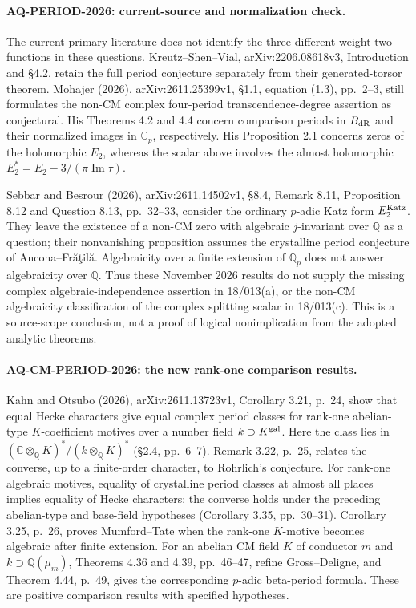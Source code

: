 \documentclass[11pt,a4paper]{article}
\theoremstyle{definition}\newtheorem{definition}[theorem]{Definition}
\theoremstyle{remark}\newtheorem{remark}[theorem]{Remark}
\begin{document}
\paragraph{AQ-PERIOD-2026: current-source and normalization check.}
The current primary literature does not identify the
three different weight-two functions in these questions.
Kreutz--Shen--Vial, arXiv:2206.08618v3, Introduction
and \S4.2, retain the full period conjecture separately
from their generated-torsor theorem. Mohajer (2026),
arXiv:2611.25399v1, \S1.1, equation (1.3), pp.~2--3,
still formulates the non-CM complex four-period
transcendence-degree assertion as conjectural.
His Theorems 4.2 and 4.4 concern comparison periods
in $B_{\rm dR}$ and their normalized images in
$\mathbb C_p$, respectively. His Proposition 2.1
concerns zeros of the holomorphic $E_2$, whereas
the scalar above involves the almost holomorphic
$E_2^*=E_2-3/(\pi\operatorname{Im}\tau)$.

Sebbar and Besrour (2026), arXiv:2611.14502v1,
\S8.4, Remark 8.11, Proposition 8.12 and
Question 8.13, pp.~32--33, consider the ordinary
$p$-adic Katz form $E^{\rm Katz}_2$. They leave
the existence of a non-CM zero with algebraic
$j$-invariant over $\mathbb Q$ as a question;
their nonvanishing proposition assumes the crystalline
period conjecture of Ancona--Fr\u a\c til\u a.
Algebraicity over a finite extension of $\mathbb Q_p$
does not answer algebraicity over $\mathbb Q$.
Thus these November 2026 results do not supply the
missing complex algebraic-independence assertion in
18/013(a), or the non-CM algebraicity classification of
the complex splitting scalar in 18/013(c). This is a
source-scope conclusion, not a proof of logical
nonimplication from the adopted analytic theorems.

\paragraph{AQ-CM-PERIOD-2026: the new rank-one comparison results.}
Kahn and Otsubo (2026), arXiv:2611.13723v1,
Corollary 3.21, p.~24, show that equal Hecke characters
give equal complex period classes for rank-one abelian-type
$K$-coefficient motives over a number field $k\supset K^{\rm gal}$.
Here the class lies in
$(\mathbb C\otimes_{\mathbb Q}K)^*/(k\otimes_{\mathbb Q}K)^*$
(\S2.4, pp.~6--7).
Remark 3.22, p.~25, relates the converse, up to a finite-order
character, to Rohrlich's conjecture.
For rank-one algebraic motives, equality of crystalline period
classes at almost all places implies equality of Hecke characters;
the converse holds under the preceding abelian-type and base-field
hypotheses (Corollary 3.35, pp.~30--31).
Corollary 3.25, p.~26, proves Mumford--Tate when the rank-one
$K$-motive becomes algebraic after finite extension.
For an abelian CM field $K$ of conductor $m$ and
$k\supset\mathbb Q(\mu_m)$,
Theorems 4.36 and 4.39, pp.~46--47,
refine Gross--Deligne, and Theorem 4.44, p.~49,
gives the corresponding $p$-adic beta-period formula.
These are positive comparison results with specified hypotheses.
\end{document}
